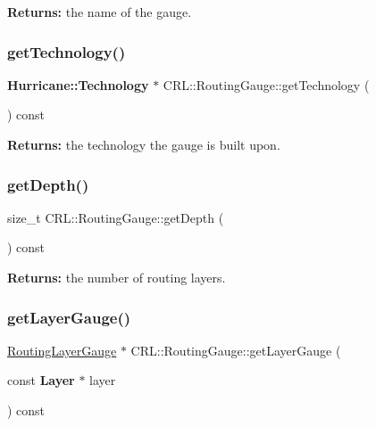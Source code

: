 {\bfseries Returns\+:} the name of the gauge. \mbox{\label{classCRL_1_1RoutingGauge_a34cb010c6d36875f4890bddc78fb8861}} 
\subsubsection{\texorpdfstring{get\+Technology()}{getTechnology()}}
{\footnotesize\ttfamily \textbf{ Hurricane\+::\+Technology} $\ast$ C\+R\+L\+::\+Routing\+Gauge\+::get\+Technology (\begin{DoxyParamCaption}{ }\end{DoxyParamCaption}) const\hspace{0.3cm}{\ttfamily [inline]}}

{\bfseries Returns\+:} the technology the gauge is built upon. \mbox{\label{classCRL_1_1RoutingGauge_aed316848ee74c270bf117562e8d5faa0}} 
\subsubsection{\texorpdfstring{get\+Depth()}{getDepth()}}
{\footnotesize\ttfamily size\+\_\+t C\+R\+L\+::\+Routing\+Gauge\+::get\+Depth (\begin{DoxyParamCaption}{ }\end{DoxyParamCaption}) const\hspace{0.3cm}{\ttfamily [inline]}}

{\bfseries Returns\+:} the number of routing layers. \mbox{\label{classCRL_1_1RoutingGauge_aa0f0e65f45814ba0104daafbc271a12d}} 
\subsubsection{\texorpdfstring{get\+Layer\+Gauge()}{getLayerGauge()}\hspace{0.1cm}{\footnotesize\ttfamily [1/2]}}
{\footnotesize\ttfamily \hyperlink{classCRL_1_1RoutingLayerGauge}{Routing\+Layer\+Gauge} $\ast$ C\+R\+L\+::\+Routing\+Gauge\+::get\+Layer\+Gauge (\begin{DoxyParamCaption}\item[{const \textbf{ Layer} $\ast$}]{layer }\end{DoxyParamCaption}) const}

